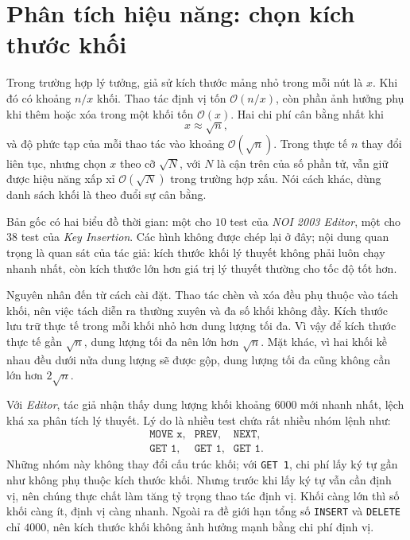\documentclass[11pt]{article}
\newcommand{\Oh}{\mathcal{O}}
\begin{document}
\section{Phân tích hiệu năng: chọn kích thước khối}

Trong trường hợp lý tưởng, giả sử kích thước mảng nhỏ trong mỗi nút là \(x\).
Khi đó có khoảng \(n/x\) khối. Thao tác định vị tốn \(\Oh(n/x)\), còn phần
ảnh hưởng phụ khi thêm hoặc xóa trong một khối tốn \(\Oh(x)\). Hai chi phí
cân bằng nhất khi
\[
  x \approx \sqrt n,
\]
và độ phức tạp của mỗi thao tác vào khoảng \(\Oh(\sqrt n)\). Trong thực tế
\(n\) thay đổi liên tục, nhưng chọn \(x\) theo cỡ \(\sqrt N\), với \(N\) là
cận trên của số phần tử, vẫn giữ được hiệu năng xấp xỉ \(\Oh(\sqrt N)\) trong
trường hợp xấu. Nói cách khác, dùng danh sách khối là theo đuổi sự cân bằng.

Bản gốc có hai biểu đồ thời gian: một cho \(10\) test của \textit{NOI 2003
Editor}, một cho \(38\) test của \textit{Key Insertion}. Các hình không được
chép lại ở đây; nội dung quan trọng là quan sát của tác giả: kích thước khối
lý thuyết không phải luôn chạy nhanh nhất, còn kích thước lớn hơn giá trị lý
thuyết thường cho tốc độ tốt hơn.

Nguyên nhân đến từ cách cài đặt. Thao tác chèn và xóa đều phụ thuộc vào tách
khối, nên việc tách diễn ra thường xuyên và đa số khối không đầy. Kích thước
lưu trữ thực tế trong mỗi khối nhỏ hơn dung lượng tối đa. Vì vậy để kích
thước thực tế gần \(\sqrt n\), dung lượng tối đa nên lớn hơn \(\sqrt n\).
Mặt khác, vì hai khối kề nhau đều dưới nửa dung lượng sẽ được gộp, dung lượng
tối đa cũng không cần lớn hơn \(2\sqrt n\).

Với \textit{Editor}, tác giả nhận thấy dung lượng khối khoảng \(6000\) mới
nhanh nhất, lệch khá xa phân tích lý thuyết. Lý do là nhiều test chứa rất
nhiều nhóm lệnh như:
\[
\begin{array}{lll}
\texttt{MOVE x}, & \texttt{PREV}, & \texttt{NEXT},\\
\texttt{GET 1}, & \texttt{GET 1}, & \texttt{GET 1}.
\end{array}
\]
Những nhóm này không thay đổi cấu trúc khối; với \texttt{GET 1}, chi phí lấy
ký tự gần như không phụ thuộc kích thước khối. Nhưng trước khi lấy ký tự vẫn
cần định vị, nên chúng thực chất làm tăng tỷ trọng thao tác định vị. Khối càng
lớn thì số khối càng ít, định vị càng nhanh. Ngoài ra đề giới hạn tổng số
\texttt{INSERT} và \texttt{DELETE} chỉ \(4000\), nên kích thước khối không
ảnh hưởng mạnh bằng chi phí định vị.
\end{document}
